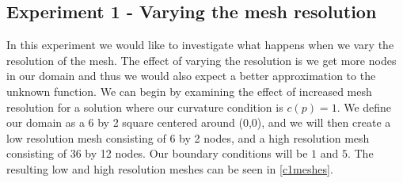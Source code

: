 \subsection{Experiment 1 - Varying the mesh resolution}
In this experiment we would like to investigate what happens when we vary the resolution of the mesh. The effect of varying the resolution is we get more nodes in our domain and thus we would also expect a better approximation to the unknown function. We can begin by examining the effect of increased mesh resolution for a solution where our curvature condition is $c(p) = 1$. We define our domain as a 6 by 2 square centered around (0,0), and we will then create a low resolution mesh consisting of 6 by 2 nodes, and a high resolution mesh consisting of 36 by 12 nodes. Our boundary conditions will be $1$ and $5$. The resulting low and high resolution meshes can be seen in \autoref{c1meshes}.
